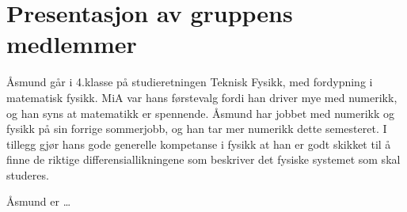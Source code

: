 \chapter{Presentasjon av gruppens medlemmer}
Åsmund går i 4.klasse på studieretningen Teknisk Fysikk, med fordypning i
matematisk fysikk. MiA var hans førstevalg fordi han driver mye med numerikk, og
han syns at matematikk er spennende. Åsmund har jobbet med numerikk og fysikk
på sin forrige sommerjobb, og han tar mer numerikk dette semesteret. I tillegg
gjør hans gode generelle kompetanse i fysikk at han er godt skikket til å finne de
riktige differensiallikningene som beskriver det fysiske systemet som skal
studeres.

Åsmund er \ldots

\lipsum[1-2] %

\lipsum[3-4]

\lipsum[5-6]

\lipsum[7-8]

